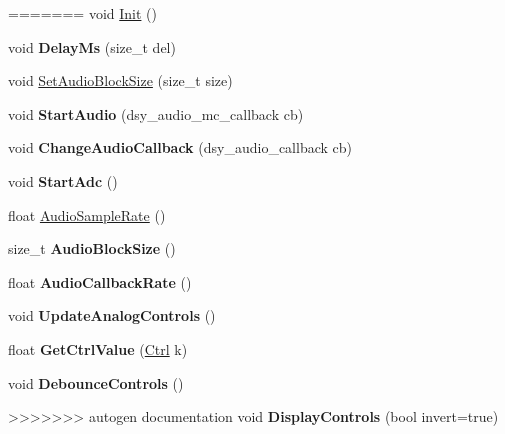 \begin{DoxyCompactItemize}
=======
void \hyperlink{classdaisy_1_1_daisy_patch_ae772fc3a20481cddbebebabc1232d552}{Init} ()
\item 
\mbox{\label{classdaisy_1_1_daisy_patch_af62cf60219c3bcf00727c713520acfe6}} 
void {\bfseries Delay\+Ms} (size\+\_\+t del)
\item 
void \hyperlink{classdaisy_1_1_daisy_patch_a712e4adb0b23edc20439eaeaab568268}{Set\+Audio\+Block\+Size} (size\+\_\+t size)
\item 
\mbox{\label{classdaisy_1_1_daisy_patch_adc66cae03908a8c4f206c3f00970a16e}} 
void {\bfseries Start\+Audio} (dsy\+\_\+audio\+\_\+mc\+\_\+callback cb)
\item 
\mbox{\label{classdaisy_1_1_daisy_patch_a9f17b0e08d0b145b836ab78f91be4ccc}} 
void {\bfseries Change\+Audio\+Callback} (dsy\+\_\+audio\+\_\+callback cb)
\item 
\mbox{\label{classdaisy_1_1_daisy_patch_aa58384dd415262a57351bb97067900d8}} 
void {\bfseries Start\+Adc} ()
\item 
float \hyperlink{classdaisy_1_1_daisy_patch_ab85c5b9dfdbe948e471759a098485223}{Audio\+Sample\+Rate} ()
\item 
\mbox{\label{classdaisy_1_1_daisy_patch_a737b0a4cbbd9a32fde25f55b3801b2c8}} 
size\+\_\+t {\bfseries Audio\+Block\+Size} ()
\item 
\mbox{\label{classdaisy_1_1_daisy_patch_ab9962e61bc4285345dba750973146652}} 
float {\bfseries Audio\+Callback\+Rate} ()
\item 
\mbox{\label{classdaisy_1_1_daisy_patch_ae0cdb7fcabcda313e698a3bceaccc169}} 
void {\bfseries Update\+Analog\+Controls} ()
\item 
\mbox{\label{classdaisy_1_1_daisy_patch_a459e32ebcc6862f39044dbfc03c600d2}} 
float {\bfseries Get\+Ctrl\+Value} (\hyperlink{classdaisy_1_1_daisy_patch_aefa3638dd587fe20c48bbdfba3cd72b3}{Ctrl} k)
\item 
\mbox{\label{classdaisy_1_1_daisy_patch_ad3e62e675aa9d6d29791cd93679f3d90}} 
void {\bfseries Debounce\+Controls} ()
\item 
\mbox{\label{classdaisy_1_1_daisy_patch_abab4626cfb89c256f2ff3115722dbfdd}} 
>>>>>>> autogen documentation
void {\bfseries Display\+Controls} (bool invert=true)
\end{DoxyCompactItemize}
